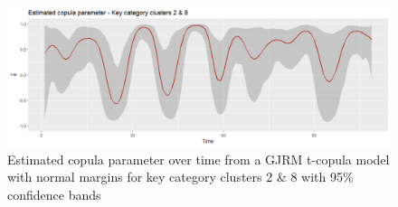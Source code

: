 \begin{figure}[H]
\centering
  \includegraphics[width=0.95\linewidth]{figures/estimated_theta_kcc_28.png}
  \caption{Estimated copula parameter over time from a \ac{GJRM} t-copula model with normal margins for key category clusters 2 \& 8 with 95\% confidence bands}
  \label{fig:estimated_theta_kcc_28}
\end{figure}















%
%
%
%
%



